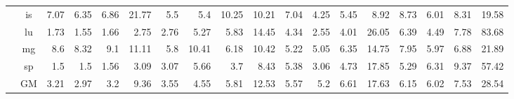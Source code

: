 \begin{table*}[]
\begin{center}
{\begin{tabular}{|c|c|rrrr|rrrr|rrrr|rrrr|}
 & is &          7.07 &          6.35 &         6.86 &         21.77 &          5.5 &           5.4 &        10.25 &         10.21   &      7.04 &           4.25 &          5.45 &           8.92 &          8.73 &           6.01 &          8.31 &          19.58 \\
 & lu &          1.73 &          1.55 &         1.66 &          2.75 &         2.76 &          5.27 &         5.83 &         14.45    &     4.34 &           2.55 &          4.01 &          26.05 &          6.39 &           4.49 &          7.78 &          83.68 \\
 & mg &           8.6 &          8.32 &          9.1 &         11.11 &          5.8 &         10.41 &         6.18 &         10.42   &      5.22 &           5.05 &          6.35 &          14.75 &          7.95 &           5.97 &          6.88 &          21.89 \\
 &  sp &           1.5 &           1.5 &         1.56 &          3.09 &         3.07 &          5.66 &          3.7 &          8.43   &      5.38 &           3.06 &          4.73 &          17.85 &          5.29 &           6.31 &          9.37 &          57.42 \\ \cline{2-18}
 & GM &          3.21 &          2.97 &          3.2 &          9.36 &         3.55 &          4.55 &         5.81 &         12.53   &      5.57 &            5.2 &          6.61 &          17.63 &          6.15 &           6.02 &          7.53 &          28.54 \\
\hline
\end{tabular}
}
\end{center}
\end{table*}
